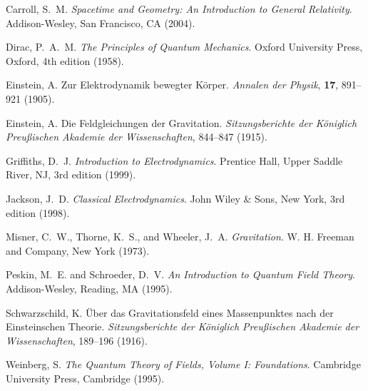 \documentclass[12pt,a4paper]{article}
\begin{document}
	
	\begin{thebibliography}{99}
		
		Carroll, S.~M.
		\newblock \textit{Spacetime and Geometry: An Introduction to General Relativity}.
		\newblock Addison-Wesley, San Francisco, CA (2004).
		
		Dirac, P.~A.~M.
		\newblock \textit{The Principles of Quantum Mechanics}.
		\newblock Oxford University Press, Oxford, 4th edition (1958).
		
		Einstein, A.
		\newblock Zur Elektrodynamik bewegter Körper.
		\newblock \textit{Annalen der Physik}, \textbf{17}, 891--921 (1905).
		
		Einstein, A.
		\newblock Die Feldgleichungen der Gravitation.
		\newblock \textit{Sitzungsberichte der Königlich Preußischen Akademie der Wissenschaften}, 844--847 (1915).
		
		Griffiths, D.~J.
		\newblock \textit{Introduction to Electrodynamics}.
		\newblock Prentice Hall, Upper Saddle River, NJ, 3rd edition (1999).
		
		Jackson, J.~D.
		\newblock \textit{Classical Electrodynamics}.
		\newblock John Wiley \& Sons, New York, 3rd edition (1998).
		
		Misner, C.~W., Thorne, K.~S., and Wheeler, J.~A.
		\newblock \textit{Gravitation}.
		\newblock W. H. Freeman and Company, New York (1973).
		
		Peskin, M.~E. and Schroeder, D.~V.
		\newblock \textit{An Introduction to Quantum Field Theory}.
		\newblock Addison-Wesley, Reading, MA (1995).
		
		Schwarzschild, K.
		\newblock Über das Gravitationsfeld eines Massenpunktes nach der Einsteinschen Theorie.
		\newblock \textit{Sitzungsberichte der Königlich Preußischen Akademie der Wissenschaften}, 189--196 (1916).
		
		Weinberg, S.
		\newblock \textit{The Quantum Theory of Fields, Volume I: Foundations}.
		\newblock Cambridge University Press, Cambridge (1995).
		
	\end{thebibliography}
	
\end{document}
